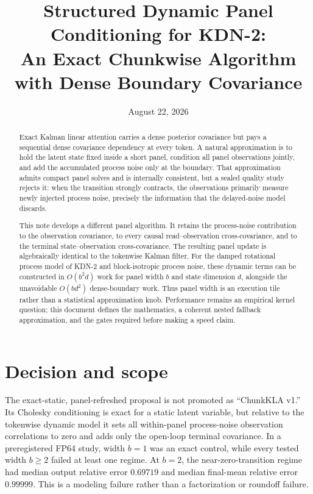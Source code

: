 \documentclass[11pt]{article}
\title{Structured Dynamic Panel Conditioning for KDN-2:\\
An Exact Chunkwise Algorithm with Dense Boundary Covariance}
\author{}
\date{August 22, 2026}
\begin{document}
\maketitle

\begin{abstract}
Exact Kalman linear attention carries a dense posterior covariance but pays a sequential dense
covariance dependency at every token.  A natural approximation is to hold the latent state fixed
inside a short panel, condition all panel observations jointly, and add the accumulated process
noise only at the boundary.  That approximation admits compact panel solves and is internally
consistent, but a sealed
quality study rejects it: when the transition strongly contracts, the observations primarily
measure newly injected process noise, precisely the information that the delayed-noise model
discards.

This note develops a different panel algorithm.  It retains the process-noise contribution to the
observation covariance, to every causal read--observation cross-covariance, and to the terminal
state--observation cross-covariance.  The resulting panel update is algebraically identical to the
tokenwise Kalman filter.  For the damped rotational process model of KDN-2 and block-isotropic
process noise, these dynamic terms can be constructed in $O(b^2d)$ work for panel width $b$ and
state dimension $d$, alongside the unavoidable $O(bd^2)$ dense-boundary work.  Thus panel width is
an execution tile rather than a statistical approximation knob.  Performance remains an
empirical kernel question; this document defines the mathematics, a coherent nested fallback
approximation, and the gates required before making a speed claim.
\end{abstract}

\section{Decision and scope}

The exact-static, panel-refreshed proposal is not promoted as ``ChunkKLA v1.''  Its Cholesky
conditioning is exact for a static latent variable, but relative to the tokenwise dynamic model it
sets all within-panel process-noise observation correlations to zero and adds only the open-loop
terminal covariance.  In a preregistered FP64 study, width $b=1$ was an exact control, while every
tested width $b\geq2$ failed at least one regime.  At $b=2$, the near-zero-transition regime had
median output relative error $0.69719$ and median final-mean relative error $0.99999$.  This is a
modeling failure rather than a factorization or roundoff failure.
\end{document}
